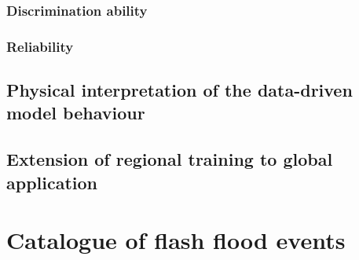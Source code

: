 \subsubsection{Discrimination ability}

\subsubsection{Reliability}



\subsection{Physical interpretation of the data-driven model behaviour}



\subsection{Extension of regional training to global application}


\section{Catalogue of flash flood events}
\label{verif_case_study}